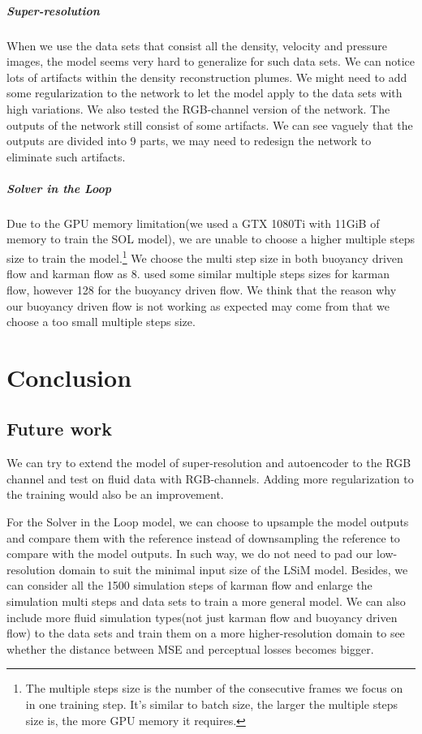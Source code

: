 \documentclass[a4paper,12pt,twoside]{report}
\begin{document}
\paragraph{Super-resolution} When we use the data sets that consist all the density, velocity and pressure images, the model seems very hard to generalize for such data sets. We can notice lots of artifacts within the density reconstruction plumes. We might need to add some regularization to the network to let the model apply to the data sets with high variations. We also tested the RGB-channel version of the network. The outputs of the network still consist of some artifacts. We can see vaguely that the outputs are divided into 9 parts, we may need to redesign the network to eliminate such artifacts.
\paragraph{Solver in the Loop}Due to the GPU memory limitation(we used a GTX 1080Ti with 11GiB of memory to train the SOL  model), we are unable to choose a higher multiple steps size to train the model.\footnote{The multiple steps size is the number of the consecutive frames we focus on in one training step. It's similar to batch size, the larger the multiple steps size is, the more GPU memory it requires.} We choose the multi step size in both buoyancy driven flow and karman flow as 8. \citeauthor{um2020sol} used some similar multiple steps sizes for karman flow, however 128 for the buoyancy driven flow. We think that the reason why our buoyancy driven flow is not working as expected may come from that we choose a too small multiple steps size.





\chapter{Conclusion}
\section{Future work}
We can try to extend the model of super-resolution and autoencoder to the RGB channel and test on fluid data with RGB-channels. Adding more regularization to the training would also be an improvement.

For the Solver in the Loop model, we can choose to upsample the model outputs and compare them with the reference instead of downsampling the reference to compare with the model outputs. In such way, we do not need to pad our low-resolution domain to suit the minimal input size of the LSiM model. Besides, we can consider all the 1500 simulation steps of karman flow and enlarge the simulation multi steps and data sets to train a more general model. We can also include more fluid simulation types(not just karman flow and buoyancy driven flow) to the data sets and train them on a more higher-resolution domain to see whether the distance between MSE and perceptual losses becomes bigger.
\end{document}
